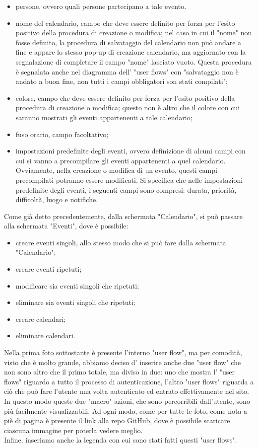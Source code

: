 \begin{itemize}
    \item persone, ovvero quali persone partecipano a tale evento.
    \item nome del calendario, campo che deve essere definito per forza per l'esito positivo della procedura di creazione o modifica; nel caso in cui il "nome" non fosse definito, la procedura di salvataggio del calendario non può andare a fine e appare lo stesso pop-up di creazione calendario, ma aggiornato con la segnalazione di completare il campo "nome" lasciato vuoto. Questa procedura è segnalata anche nel diagramma dell' "user flows" con "salvataggio non è andato a buon fine, non tutti i campi obbligatori son stati compilati";
    \item colore, campo che deve essere definito per forza per l'esito positivo della procedura di creazione o modifica; questo non è altro che il colore con cui saranno mostrati gli eventi appartenenti a tale calendario;
    \item fuso orario, campo facoltativo;
    \item impostazioni predefinite degli eventi, ovvero definizione di alcuni campi con cui si vanno a precompilare gli eventi appartenenti a quel calendario. Ovviamente, nella creazione o modifica di un evento, questi campi precompilati potranno essere modificati. Si specifica che nelle impostazioni predefinite degli eventi, i seguenti campi sono compresi: durata, priorità, difficoltà, luogo e notifiche.
\end{itemize}
Come già detto precedentemente, dalla schermata "Calendario", si può passare alla schermata "Eventi", dove è possibile:
\begin{itemize}
    \item creare eventi singoli, allo stesso modo che si può fare dalla schermata "Calendario";
    \item creare eventi ripetuti;
    \item modificare sia eventi singoli che ripetuti;
    \item eliminare sia eventi singoli che ripetuti;
    \item creare calendari;
    \item eliminare calendari.
\end{itemize}
Nella prima foto sottostante è presente l'interno "user flow", ma per comodità, visto che è molto grande, abbiamo deciso d' inserire anche due "user flow" che non sono altro che il primo totale, ma diviso in due: uno che mostra l' "user flows" riguardo a tutto il processo di autenticazione, l'altro "user flows" riguarda a ciò che può fare l'utente una volta autenticato ed entrato effettivamente nel sito. In questo modo queste due "macro" azioni, che sono percorribili dall'utente, sono più facilmente visualizzabili. Ad ogni modo, come per tutte le foto, come nota a piè di pagina è presente il link alla repo GitHub, dove è possibile scaricare ciascuna immagine per poterla vedere meglio. \\
Infine, inseriamo anche la legenda con cui sono stati fatti questi "user flows".

